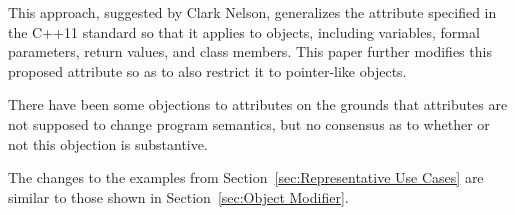 This approach, suggested by Clark Nelson, generalizes the
 attribute specified in the C++11 standard
so that it applies to objects, including variables, formal parameters,
return values, and class members.
This paper further modifies this proposed attribute so as to also restrict
it to pointer-like objects.

There have been some objections to attributes on the grounds that
attributes are not supposed to change program semantics, but no
consensus as to whether or not this objection is substantive.

The changes to the examples from
Section~\ref{sec:Representative Use Cases}
are similar to those shown in
Section~\ref{sec:Object Modifier}.
